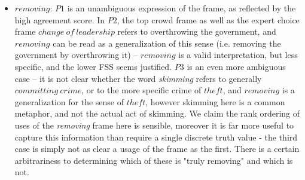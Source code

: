 \begin{itemize}

\item $removing$: $P1$ is an unambiguous expression of the frame, as reflected by the high agreement score. In $P2$, the top crowd frame as well as the expert choice frame $change\ of\ leadership$ refers to overthrowing the government, and $removing$ can be read as a generalization of this sense (i.e. removing the government by overthrowing it) -- $removing$ is a valid interpretation, but less specific, and the lower FSS seems justified. $P3$ is an even more ambiguous case -- it is not clear whether the word \textit{skimming} refers to generally $committing\ crime$, or to the more specific crime of $theft$, and $removing$ is a generalization for the sense of $theft$, however skimming here is a common metaphor, and not the actual act of skimming. We claim the rank ordering of uses of the \textit{removing} frame here is sensible, moreover it is far more useful to capture this information than require a single discrete truth value - the third case is simply not as clear a usage of the frame as the first.  There is a certain arbitrariness to determining which of these is "truly removing" and which is not.




\end{itemize}

